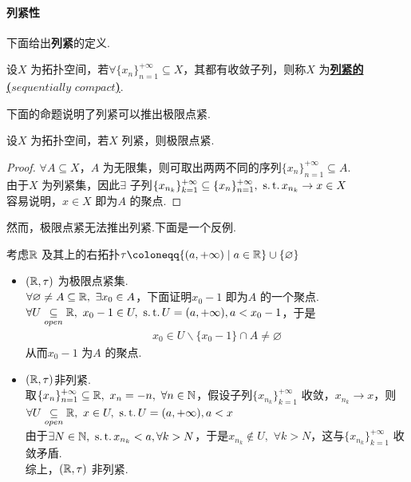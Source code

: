 \newpage
\paragraph{列紧性}
	下面给出\textbf{列紧}的定义.
	\begin{defn}\label{def 2.2.2}
		设$X$ 为拓扑空间，若$\forall \{ x_n \}_{n = 1}^{+\infty} \subseteq X$，其都有收敛子列，则称$X$ 为\underline{\textbf{列紧的}}\\
		\underline{\textbf{($sequentially \,\, compact$)}}.
	\end{defn}

	\vspace*{2em}
	下面的命题说明了列紧可以推出极限点紧.
	\begin{proposition}\label{prop 2.2.4}
		设$X$ 为拓扑空间，若$X$ 列紧，则极限点紧.
		
		\vspace*{2em}
		\begin{proof}
			$\forall A \subseteq X$，$A$ 为无限集，则可取出两两不同的序列$\{ x_n \}_{n = 1}^{+\infty} \subseteq A$.\\
			由于$X$ 为列紧集，因此$\exists$ 子列$\{ x_{n_k} \}_{k = 1}^{+\infty} \subseteq \{x_n\}_{n = 1}^{+\infty} , \,\, \operatorname{s.t.} x_{n_k} \to x \in X$\\
			容易说明，$x \in X$ 即为$A$ 的聚点.
		\end{proof}
	\end{proposition}
	
	\vspace*{2em}
	然而，极限点紧无法推出列紧.下面是一个反例.
	\begin{example}\label{ex 2.2.2}
		考虑$\mathbb{R}$ 及其上的右拓扑$\tau \coloneqq \{ (a , +\infty) \mid a \in \R \} \cup \{ \varnothing \}$
		\begin{itemize}
			\item $(\mathbb{R} , \tau)$ 为极限点紧集.\\
			$\forall \varnothing \neq A \subseteq \mathbb{R} , \,\, \exists x_0 \in A$，下面证明$x_0 - 1$ 即为$A$ 的一个聚点.\\
			$\forall U \underset{open}{\subseteq} \mathbb{R} , \,\, x_0 - 1 \in U , \,\, \operatorname{s.t.} U = (a , +\infty) , a < x_0 - 1$，于是
			\begin{align}
				x_0 \in U \backslash \{ x_0 - 1 \} \cap A \neq \varnothing
			\end{align}
			从而$x_0 - 1$ 为$A$ 的聚点.
			
			\item $(\mathbb{R} , \tau)$非列紧.\\
			取$\{ x_n \}_{n = 1}^{+\infty} \subseteq \mathbb{R} , \,\, x_n = -n , \,\, \forall n \in \mathbb{N}$，假设子列$\{ x_{n_k} \}_{k = 1}^{+\infty}$ 收敛，$x_{n_k} \to x$，则\\
			$\forall U \underset{open}{\subseteq} \mathbb{R} , \,\, x \in U , \,\, \operatorname{s.t.} U = (a , +\infty) , a < x$\\
			由于$\exists N \in \mathbb{N} , \,\, \operatorname{s.t.} x_{n_k} < a , \forall k > N$，于是$x_{n_k} \notin U , \,\, \forall k > N$，这与$\{ x_{n_k} \}_{k = 1}^{+\infty}$ 收敛矛盾.\\
			综上，$(\mathbb{R} , \tau)$ 非列紧.
		\end{itemize}
	\end{example}

